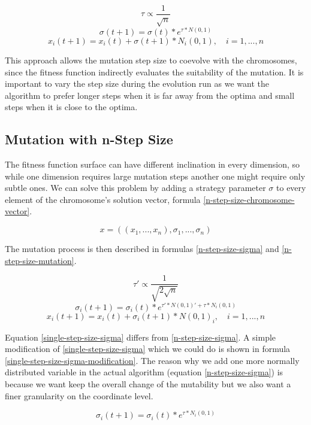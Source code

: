 \begin{equation}
    \tau \propto \frac{1}{\sqrt{n}}
\end{equation}
\begin{equation} \label{single-step-size-sigma}
    \sigma(t+1) = \sigma(t) * e^{\tau * N(0,1)}
\end{equation}
\begin{equation} \label{single-step-size-mutation}
    x_i(t+1) = x_i(t) + \sigma(t+1) * N_i(0,1), \quad i = 1,...,n
\end{equation}

This approach allows the mutation step size to coevolve with the chromosomes, since the fitness function indirectly evaluates the suitability of the mutation. It is important to vary the step size during the evolution run as we want the algorithm to prefer longer steps when it is far away from the optima and small steps when it is close to the optima.

\subsection{Mutation with n-Step Size}
The fitness function surface can have different inclination in every dimension, so while one dimension requires large mutation steps another one might require only subtle ones. We can solve this problem by adding a strategy parameter $\sigma$ to every element of the chromosome's solution vector, formula \ref{n-step-size-chromosome-vector}.

 \begin{equation} \label{n-step-size-chromosome-vector}
    x = ((x_1,...,x_n), \sigma_1,...,\sigma_n)
 \end{equation}

 The mutation process is then described in formulas \ref{n-step-size-sigma} and \ref{n-step-size-mutation}.

\begin{equation}
\tau' \propto \frac{1}{\sqrt{2\sqrt{n}}}
\end{equation}
\begin{equation} \label{n-step-size-sigma}
    \sigma_i(t+1) = \sigma_i(t) * e^{\tau' * N(0,1)' + \tau * N_i(0,1)}
\end{equation}
\begin{equation} \label{n-step-size-mutation}
    x_i(t+1) = x_i(t) + \sigma_i(t+1) * N(0,1)_i, \quad i = 1,...,n
\end{equation}

Equation \ref{single-step-size-sigma} differs from \ref{n-step-size-sigma}. A simple modification of \ref{single-step-size-sigma} which we could do is shown in formula \ref{single-step-size-sigma-modification}. The reason why we add one more normally distributed variable in the actual algorithm (equation \ref{n-step-size-sigma}) is because we want keep the overall change of the mutability but we also want a finer granularity on the coordinate level.

\begin{equation}\label{single-step-size-sigma-modification}
    \sigma_i(t+1) = \sigma_i(t) * e^{\tau * N_i(0,1)}
\end{equation}